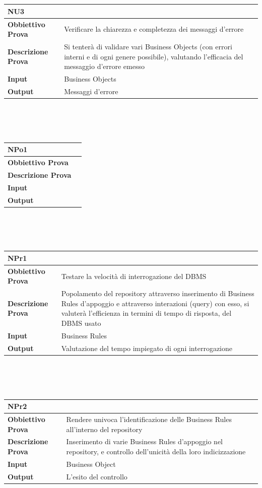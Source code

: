 \documentclass[11pt,titlepage,a4paper]{report}
\begin{document}
\\
\\
\begin{tabular}{||p{4.5cm}||p{7.5cm}||}
\hline
\textbf{\textsf{NU3}} \\
\hline
{\textbf{Obbiettivo Prova}}& Verificare la chiarezza e completezza dei messaggi d'errore\\ \hline
{\textbf{Descrizione Prova}}& Si tenter\`a di validare vari Business Objects (con errori interni e di ogni genere possibile), valutando l'efficacia del messaggio d'errore emesso \\ \hline
{\textbf{Input}}&  Business Objects \\ \hline
{\textbf{Output}}& Messaggi d'errore\\ \hline
\end{tabular} \\
\\
\\
\begin{tabular}{||p{4.5cm}||p{7.5cm}||}
\hline
\textbf{\textsf{NPo1}} \\
\hline
{\textbf{Obbiettivo Prova}}& \\ \hline
{\textbf{Descrizione Prova}}&  \\ \hline
{\textbf{Input}}&  \\ \hline
{\textbf{Output}}& \\ \hline
\end{tabular} \\
\\
\\
\begin{tabular}{||p{4.5cm}||p{7.5cm}||}
\hline
\textbf{\textsf{NPr1}} \\
\hline
{\textbf{Obbiettivo Prova}}& Testare la velocit\`a di interrogazione del DBMS\\ \hline
{\textbf{Descrizione Prova}}& Popolamento del repository attraverso inserimento di Business Rules d'appoggio e attraverso interazioni (query) con esso, si valuter\`a l'efficienza in termini di tempo di risposta, del DBMS usato  \\ \hline
{\textbf{Input}}& Business Rules \\ \hline
{\textbf{Output}}& Valutazione del tempo impiegato di ogni interrogazione \\ \hline
\end{tabular} \\
\\
\\
\begin{tabular}{||p{4.5cm}||p{7.5cm}||}
\hline
\textbf{\textsf{NPr2}} \\
\hline
{\textbf{Obbiettivo Prova}}& Rendere univoca l'identificazione delle Business Rules all'interno del repository \\ \hline
{\textbf{Descrizione Prova}}& Inserimento di varie Business Rules d'appoggio nel repository, e controllo dell'unicit\`a della loro indicizzazione \\ \hline
{\textbf{Input}}& Business Object \\ \hline
{\textbf{Output}}& L'esito del controllo\\ \hline
\end{tabular} \\
\end{document}
